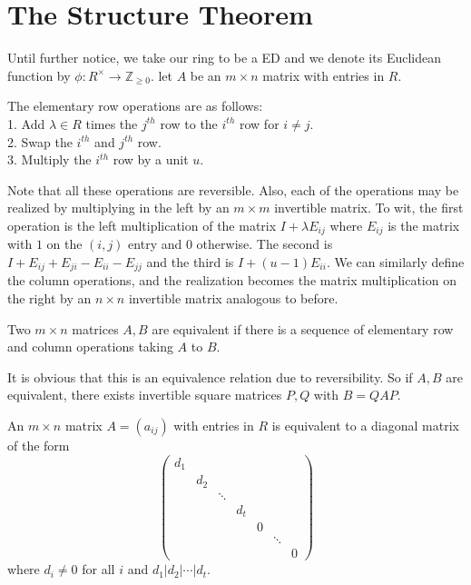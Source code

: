 \section{The Structure Theorem}
Until further notice, we take our ring to be a ED and we denote its Euclidean function by $\phi:R^\times\to\mathbb Z_{\ge 0}$.
let $A$ be an $m\times n$ matrix with entries in $R$.
\begin{definition}
    The elementary row operations are as follows:\\
    1. Add $\lambda\in R$ times the $j^{th}$ row to the $i^{th}$ row for $i\neq j$.\\
    2. Swap the $i^{th}$ and $j^{th}$ row.\\
    3. Multiply the $i^{th}$ row by a unit $u$.
\end{definition}
Note that all these operations are reversible.
Also, each of the operations may be realized by multiplying in the left by an $m\times m$ invertible matrix.
To wit, the first operation is the left multiplication of the matrix $I+\lambda E_{ij}$ where $E_{ij}$ is the matrix with $1$ on the $(i,j)$ entry and $0$ otherwise.
The second is $I+E_{ij}+E_{ji}-E_{ii}-E_{jj}$ and the third is $I+(u-1)E_{ii}$.
We can similarly define the column operations, and the realization becomes the matrix multiplication on the right by an $n\times n$ invertible matrix analogous to before.
\begin{definition}
    Two $m\times n$ matrices $A,B$ are equivalent if there is a sequence of elementary row and column operations taking $A$ to $B$.
\end{definition}
It is obvious that this is an equivalence relation due to reversibility.
So if $A,B$ are equivalent, there exists invertible square matrices $P,Q$ with $B=QAP$.
\begin{theorem}
    An $m\times n$ matrix $A=(a_{ij})$ with entries in $R$ is equivalent to a diagonal matrix of the form
    $$\begin{pmatrix}
        d_1&&&&&&\\
        &d_2&&&&&\\
        &&\ddots&&&&\\
        &&&d_t&&&\\
        &&&&0&&\\
        &&&&&\ddots&\\
        &&&&&&0
    \end{pmatrix}$$
    where $d_i\neq 0$ for all $i$ and $d_1|d_2|\cdots |d_t$.
\end{theorem}
